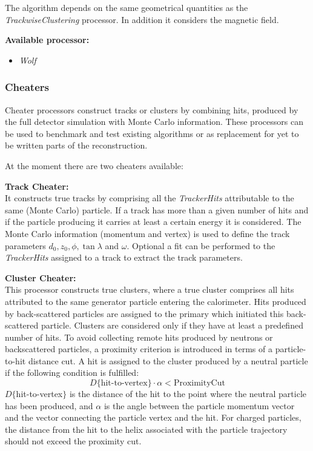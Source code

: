 The algorithm depends on the same geometrical quantities as the 
{\em TrackwiseClustering} processor. In addition it considers the
magnetic field.

{\bf Available processor:} 
\begin{itemize}
\item {\em Wolf}
\end{itemize}

\subsubsection{Cheaters}

Cheater processors construct tracks or clusters by combining hits, produced 
by the full detector simulation with Monte Carlo information.
These processors can be used to benchmark and test existing algorithms
or as replacement for yet to be written parts of the reconstruction.

At the moment there are two cheaters available:

{\bf Track Cheater:} \\
It constructs true tracks by comprising all the {\em TrackerHits} attributable
to the same (Monte Carlo) particle. If a track has more than a given number of
hits and if the particle producing it carries at least a certain 
energy it is considered. The Monte Carlo information 
(momentum and vertex) is used to define the track parameters
$d_0, z_0, \phi, \tan\lambda$ and $\omega$.
Optional a fit can be performed to the {\em TrackerHits} assigned to a track
to extract the track parameters. 

{\bf Cluster Cheater:} \\
This processor constructs true clusters, where a true cluster comprises all 
hits attributed to the same generator particle entering 
the calorimeter. Hits produced by back-scattered particles are assigned to the 
primary which initiated this back-scattered particle. 
Clusters are considered only if they have at least a predefined number of 
hits. 
To avoid collecting remote hits produced by neutrons or backscattered 
particles, a proximity criterion is introduced in terms 
of a particle-to-hit distance cut. A hit is assigned to the cluster 
produced by a neutral particle if 
the following condition is fulfilled: 
$$
D\{\textrm{hit-to-vertex}\} \cdot \alpha < \textrm{ProximityCut}
$$
$D\{$hit-to-vertex$\}$ is the distance of the hit to the point 
where the neutral particle has been produced, and $\alpha$ is the 
angle between the particle momentum vector and the vector connecting 
the particle vertex and the hit. 
For charged particles, the distance from the hit to 
the helix associated with the particle trajectory should
not exceed the proximity cut. 

